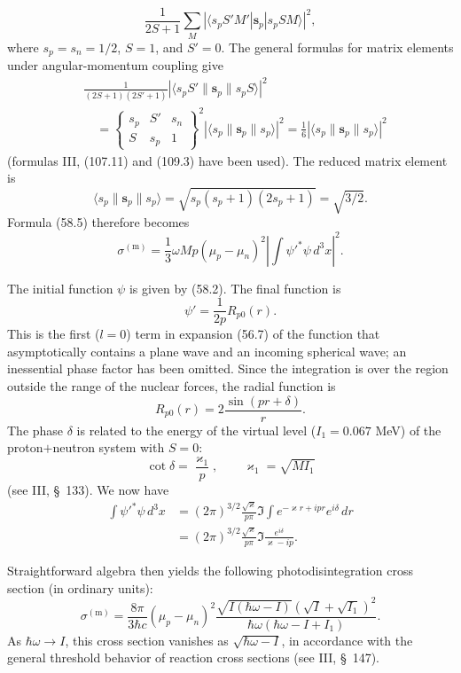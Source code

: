 \[
\frac1{2S+1}\sum_M
|\langle s_pS'M'|\mathbf s_p|s_pSM\rangle|^2,
\]
where $s_p=s_n=1/2$, $S=1$, and $S'=0$. The general formulas for matrix elements under angular-momentum coupling give
\[
\begin{aligned}
&\frac1{(2S+1)(2S'+1)}
|\langle s_pS'\|\mathbf s_p\|s_pS\rangle|^2\\
&\quad=\begin{Bmatrix}s_p&S'&s_n\\S&s_p&1\end{Bmatrix}^{\!2}
|\langle s_p\|\mathbf s_p\|s_p\rangle|^2
=\frac16|\langle s_p\|\mathbf s_p\|s_p\rangle|^2
\end{aligned}
\]
(formulas III, (107.11) and (109.3) have been used). The reduced matrix element is
\[
\langle s_p\|\mathbf s_p\|s_p\rangle
=\sqrt{s_p(s_p+1)(2s_p+1)}=\sqrt{3/2}.
\]
Formula (58.5) therefore becomes
\begin{equation}
\sigma^{(\mathrm m)}=\frac13\omega Mp(\mu_p-\mu_n)^2
\left|\int\psi'^*\psi\,d^3x\right|^2.
\tag{58.6}
\end{equation}

The initial function $\psi$ is given by (58.2). The final function is
\[
\psi'=\frac1{2p}R_{p0}(r).
\]
This is the first ($l=0$) term in expansion (56.7) of the function that asymptotically contains a plane wave and an incoming spherical wave; an inessential phase factor has been omitted. Since the integration is over the region outside the range of the nuclear forces, the radial function is
\[
R_{p0}(r)=2\frac{\sin(pr+\delta)}r.
\]
The phase $\delta$ is related to the energy of the virtual level ($I_1=0.067$ MeV) of the proton$+$neutron system with $S=0$:
\[
\cot\delta=\frac{\varkappa_1}{p},
\qquad \varkappa_1=\sqrt{MI_1}
\]
(see III, \S~133). We now have
\[
\begin{aligned}
\int\psi'^*\psi\,d^3x
&=(2\pi)^{3/2}\frac{\sqrt\varkappa}{p\pi}
\Im\int e^{-\varkappa r+ipr}e^{i\delta}\,dr\\
&=(2\pi)^{3/2}\frac{\sqrt\varkappa}{p\pi}
\Im\frac{e^{i\delta}}{\varkappa-ip}.
\end{aligned}
\]

Straightforward algebra then yields the following photodisintegration cross section (in ordinary units):
\begin{equation}
\sigma^{(\mathrm m)}=\frac{8\pi}{3\hbar c}(\mu_p-\mu_n)^2
\frac{\sqrt{I(\hbar\omega-I)}(\sqrt I+\sqrt{I_1})^2}
{\hbar\omega(\hbar\omega-I+I_1)}.
\tag{58.7}
\end{equation}
As $\hbar\omega\to I$, this cross section vanishes as $\sqrt{\hbar\omega-I}$, in accordance with the general threshold behavior of reaction cross sections (see III, \S~147).

